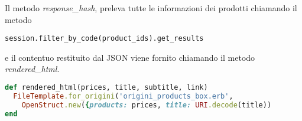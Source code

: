 Il metodo \emph{response\_hash}, preleva tutte le informazioni dei prodotti chiamando il metodo
\begin{verbatim}
session.filter_by_code(product_ids).get_results
\end{verbatim}
e il contentuo restituito dal JSON viene fornito chiamando il metodo \emph{rendered\_html}.

\begin{lstlisting}[language=Ruby,caption={Il metodo \emph{rendered\_html} restituisce il contenuto dell'erb compilato con i parametri passati con la chiamata FileTemplate.for\_origin}] 
def rendered_html(prices, title, subtitle, link)
  FileTemplate.for_origini('origini_products_box.erb', 
    OpenStruct.new({products: prices, title: URI.decode(title))
end
\end{lstlisting}

